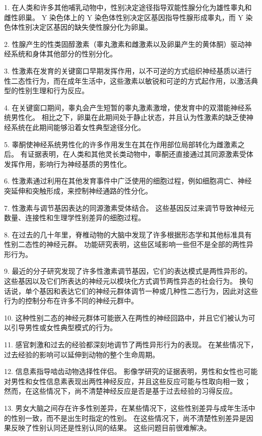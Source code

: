 1. 在人类和许多其他哺乳动物中，性别决定途径指导双能性腺分化为雄性睾丸和雌性卵巢。
Y 染色体上的 Y 染色体性别决定区基因指导性腺形成睾丸，而 Y 染色体性别决定区基因的缺失使性腺分化为卵巢。


2. 性腺产生的性类固醇激素（睾丸激素和雌激素以及卵巢产生的黄体酮）驱动神经系统和身体其他部分的性别分化。


3. 性激素在发育的关键窗口早期发挥作用，以不可逆的方式组织神经基质以进行性二态性行为，而在成年生活中，这些激素以敏锐和可逆的方式起作用，以激活典型的性别生理和行为反应。


4. 在关键窗口期间，睾丸会产生短暂的睾丸激素激增，使发育中的双潜能神经系统男性化。
相比之下，卵巢在此期间处于静止状态，并且认为性激素的缺乏使神经系统在此期间能够沿着女性典型途径分化。


5. 睾酮使神经系统男性化的许多作用发生在其在作用部位局部转化为雌激素之后。
有证据表明，在人类和其他灵长类动物中，睾酮还直接通过其同源激素受体发挥作用，影响行为神经基质的男性化。


6. 性激素通过利用在其他发育事件中广泛使用的细胞过程，例如细胞凋亡、神经突延伸和突触形成，来控制神经通路的性分化。


7. 性激素与调节基因表达的同源激素受体结合。
这些基因反过来调节导致神经元数量、连接性和生理学性别差异的细胞过程。


8. 在过去的几十年里，脊椎动物的大脑中发现了许多根据形态学和其他标准具有性别二态性的神经元群。
功能研究表明，这些区域影响一些但不是全部的两性异形行为。


9. 最近的分子研究发现了许多性激素调节基因，它们的表达模式是两性异形的。
这些基因以及它们所表达的神经元以模块化方式调节两性异态的社会行为。
换句话说，单个基因和表达它们的神经元群体调节一种或几种性二态行为，因此对这些行为的控制分布在许多不同的神经元群中。


10. 这种性别二态的神经元群体可能嵌入在两性的神经回路中，并且它们被认为可以引导男性或女性典型模式的行为。


11. 感官刺激和过去的经验都深刻地调节了两性异形行为的表现。
在某些情况下，过去经验的影响可以延伸到动物的整个生命周期。


12. 信息素指导啮齿动物选择性伴侣。
影像学研究的证据表明，男性和女性也可能对男性和女性信息素表现出两性神经反应，并且这些反应可能与性取向相一致；
然而，在这些情况下，尚不清楚神经反应是否是基于过去经验的习得反应。


13. 男女大脑之间存在许多性别差异，在某些情况下，这些性别差异与成年生活中的性别一致，而不是出生时指定的性别。
在这些情况下，尚不清楚性别差异是因果反映了性别认同还是性别认同的结果。
这些问题目前很难解决。




